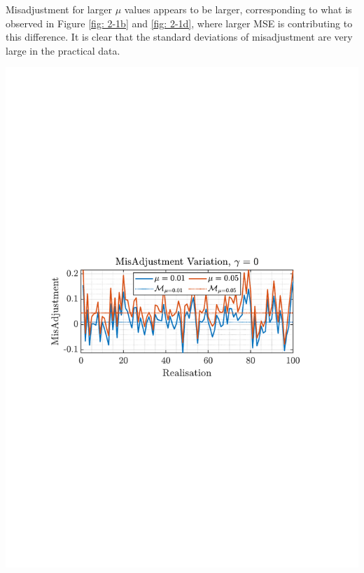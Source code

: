 \documentclass[12pt]{article}
\numberwithin{equation}{section}
\begin{document}
			\begin{minipage}[b]{0.49\textwidth}
				Misadjustment for larger $\mu$ values appears to be larger, corresponding to what is observed in Figure \ref{fig: 2-1b} and \ref{fig: 2-1d}, where larger MSE is contributing to this difference. It is clear that the standard deviations of misadjustment are very large in the practical data.
			\end{minipage}%
			\begin{minipage}{0.04\textwidth}
				\hspace*{0.04\textwidth}
			\end{minipage}%
			\begin{minipage}[t]{0.49\textwidth}
				\centering
				\includegraphics[trim={2.2cm 11.2cm 3.15cm  11.2cm}, clip, width=\textwidth]{../MATLAB/figures/q2_1cd_fig01.pdf} 
				\captionsetup{justification=centering}
				\label{fig: 2-1c}			
			\end{minipage}%
\end{document}
